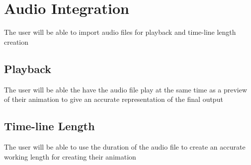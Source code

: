 \documentclass[12pt]{article}
\begin{document}
    \section{Audio Integration}
    The user will be able to import audio files for playback and time-line length creation
        \subsection{Playback}
        The user will be able the have the audio file play at the same time as a preview of their animation to give an accurate representation of the final output
        \subsection{Time-line Length}
        The user will be able to use the duration of the audio file to create an accurate working length for creating their animation 
\end{document}
